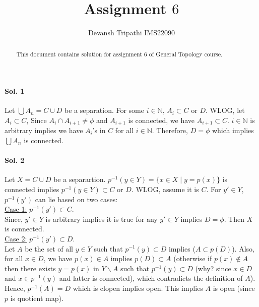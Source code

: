 \documentclass[12pt,reqno]{amsart}
\title{Assignment $6$}
\author{Devansh Tripathi IMS22090}
\theoremstyle{plain}
\theoremstyle{definition}
\newcommand{\bb}[1]{\mathbb{#1}}
\begin{document}
\begin{abstract}
    This document contains solution for assignment $6$ of General Topology course.
\end{abstract}
\maketitle
\begin{center}
    \item \paragraph{{\bf Sol. 1}}
\end{center}
Let $\bigcup A_n = C \cup D$ be a separation. For some $i \in \bb N$, $A_i \subset C \text{ or } D$. WLOG, let $A_i \subset C$, Since $A_i \cap A_{i+1} \neq \phi$ and $A_{i+1}$ is connected, we have $A_{i+1} \subset C$. $i \in \bb N$ is arbitrary implies we have $A_i$'s in $C$ for all $i \in \bb N$. Therefore, $D = \phi$ which implies $\bigcup A_n$ is connected.

\begin{center}
    \item \paragraph{{\bf Sol. 2}}
\end{center}
Let $X = C \cup D$ be a separartion. $p^{-1}(y \in Y) = \{x \in X \mid y = p(x) \}$ is connected implies $p^{-1}(y \in Y) \subset C \text{ or } D$. WLOG, assume it is $C$. For $y' \in Y$, $p^{-1}(y')$ can lie based on two cases:\\
\underline{Case 1:} $p^{-1}(y') \subset C$.\\ Since, $y' \in Y$ is arbitrary implies it is true for any $y' \in Y$ implies $D = \phi$. Then $X$ is connected.\\
\underline{Case 2:} $p^{-1}(y') \subset D$. \\
Let $A$ be the set of all $y \in Y$ such that $p^{-1}(y) \subset D$ implies ($A \subset p(D)$). Also, for all $x \in D$, we have $p(x) \in A$ implies $p(D) \subset A$ (otherwise if $p(x) \notin A$ then there exists $y = p(x)$ in $Y\backslash A$ such that $p^{-1}(y) \subset D$ (why? since $x \in D$ and $x \in p^{-1}(y)$ and latter is connected), which contradicts the definition of $A$). Hence, $p^{-1}(A) = D$ which is clopen implies open. This implies $A$ is open (since $p$ is quotient map).
\end{document}
